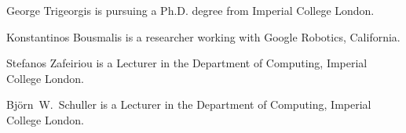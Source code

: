 \documentclass[10pt,journal,compsoc]{IEEEtran}
\begin{document}




\vspace{-1.3cm}
\begin{IEEEbiographynophoto}{George Trigeorgis}
 is pursuing a Ph.D. degree from Imperial College London.
\end{IEEEbiographynophoto}
\vspace{-1.2cm}
\begin{IEEEbiographynophoto}{Konstantinos Bousmalis}
is a researcher working with Google Robotics, California.
\end{IEEEbiographynophoto}
\vspace{-1.2cm}
\begin{IEEEbiographynophoto}{Stefanos Zafeiriou}
is a Lecturer in the Department of Computing, Imperial College London.
\end{IEEEbiographynophoto}
\vspace{-1.2cm}
\begin{IEEEbiographynophoto}{Bj\"orn~W.~Schuller}
is a Lecturer in the Department of Computing, Imperial College London.
\end{IEEEbiographynophoto}


\end{document}
